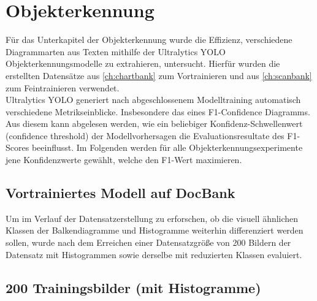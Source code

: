 \section{Objekterkennung}

Für das Unterkapitel der Objekterkennung wurde die Effizienz, verschiedene Diagrammarten aus Texten mithilfe der Ultralytics YOLO Objekterkennungsmodelle zu extrahieren, untersucht. Hierfür wurden die erstellten Datensätze aus \ref{ch:chartbank} zum Vortrainieren und aus \ref{ch:scanbank} zum Feintrainieren verwendet.
\\
Ultralytics YOLO generiert nach abgeschlossenem Modelltraining automatisch verschiedene Metrikseinblicke. Insbesondere das eines F1-Confidence Diagramms. Aus diesem kann abgelesen werden, wie ein beliebiger Konfidenz-Schwellenwert (confidence threshold) der Modellvorhersagen die Evaluationsresultate des F1-Scores beeinflusst. Im Folgenden werden für alle Objekterkennungsexperimente jene Konfidenzwerte gewählt, welche den F1-Wert maximieren.

\subsection{Vortrainiertes Modell auf DocBank}
Um im Verlauf der Datensatzerstellung zu erforschen, ob die visuell ähnlichen Klassen der Balkendiagramme und Histogramme weiterhin differenziert werden sollen, wurde nach dem Erreichen einer Datensatzgröße von 200 Bildern der Datensatz mit Histogrammen sowie derselbe mit reduzierten Klassen evaluiert.

\subsection*{200 Trainingsbilder (mit Histogramme)}

